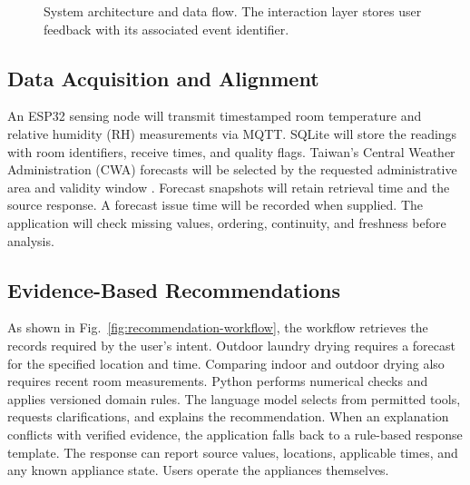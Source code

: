 \documentclass[conference]{IEEEtran}
\begin{document}
\begin{figure}[t]
\centering
{}
\caption{System architecture and data flow. The interaction layer stores user feedback with its associated event identifier.}
\label{fig:architecture}
\end{figure}

\subsection{Data Acquisition and Alignment}
An ESP32 sensing node will transmit timestamped room temperature and relative humidity (RH) measurements via MQTT. SQLite will store the readings with room identifiers, receive times, and quality flags. Taiwan's Central Weather Administration (CWA) forecasts will be selected by the requested administrative area and validity window \cite{cwa_open_data}. Forecast snapshots will retain retrieval time and the source response. A forecast issue time will be recorded when supplied. The application will check missing values, ordering, continuity, and freshness before analysis.

\subsection{Evidence-Based Recommendations}
As shown in Fig.~\ref{fig:recommendation-workflow}, the workflow retrieves the records required by the user's intent. Outdoor laundry drying requires a forecast for the specified location and time. Comparing indoor and outdoor drying also requires recent room measurements. Python performs numerical checks and applies versioned domain rules. The language model selects from permitted tools, requests clarifications, and explains the recommendation. When an explanation conflicts with verified evidence, the application falls back to a rule-based response template. The response can report source values, locations, applicable times, and any known appliance state. Users operate the appliances themselves.
\end{document}

